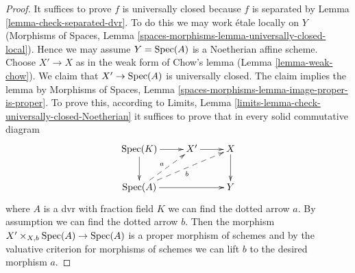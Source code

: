 \begin{proof}
It suffices to prove $f$ is universally closed because $f$ is separated by
Lemma \ref{lemma-check-separated-dvr}.
To do this we may work \'etale locally on $Y$
(Morphisms of Spaces, Lemma
\ref{spaces-morphisms-lemma-universally-closed-local}).
Hence we may assume $Y = \mathop{\mathrm{Spec}}(A)$ is a Noetherian affine scheme.
Choose $X' \to X$ as in the weak form of Chow's lemma
(Lemma \ref{lemma-weak-chow}). We claim that $X' \to \mathop{\mathrm{Spec}}(A)$
is universally closed. The claim implies the lemma by
Morphisms of Spaces, Lemma \ref{spaces-morphisms-lemma-image-proper-is-proper}.
To prove this, according to
Limits, Lemma \ref{limits-lemma-check-universally-closed-Noetherian}
it suffices to prove that in every solid commutative diagram
$$
\xymatrix{
\Spec(K) \ar[r] \ar[d] & X' \ar[r] & X \ar[d] \\
\Spec(A) \ar[rr] \ar@{-->}[ru]^a \ar@{-->}[rru]_b & & Y
}
$$
where $A$ is a dvr with fraction field $K$ we can find the
dotted arrow $a$. By assumption we can find the dotted arrow $b$.
Then the morphism $X' \times_{X, b} \mathop{\mathrm{Spec}}(A) \to \mathop{\mathrm{Spec}}(A)$
is a proper morphism of schemes and by the valuative criterion
for morphisms of schemes we can lift $b$ to the desired morphism $a$.
\end{proof}

